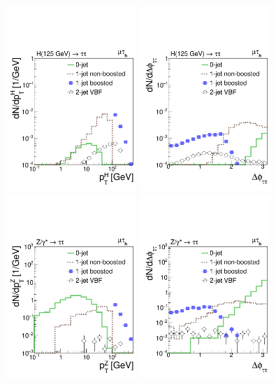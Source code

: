 \begin{figure}
\setlength{\unitlength}{1mm}
\begin{center}
\includegraphics*[height=70mm]{plots_sept_16/Higgs_pT_muhad.pdf}
\includegraphics*[height=70mm]{plots_sept_16/Higgs_dPhiTauTau_muhad.pdf}\\
\includegraphics*[height=70mm]{plots_sept_16/DYJets_pT_muhad.pdf}
\includegraphics*[height=70mm]{plots_sept_16/DYJets_dPhiTauTau_muhad.pdf}

\end{center}
\end{figure}
